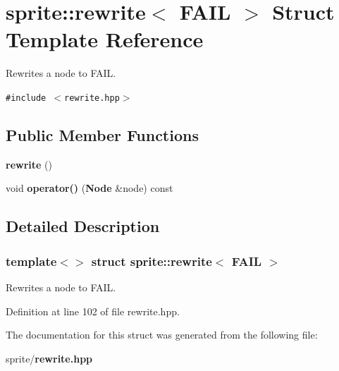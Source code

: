 \section{sprite::rewrite$<$ FAIL $>$ Struct Template Reference}
\label{structsprite_1_1rewrite_3_01FAIL_01_4}
Rewrites a node to FAIL.  


{\tt \#include $<$rewrite.hpp$>$}

\subsection*{Public Member Functions}
\begin{CompactItemize}
\item 
{\bf rewrite} ()\label{structsprite_1_1rewrite_3_01FAIL_01_4_a0}

\item 
void {\bf operator()} ({\bf Node} \&node) const \label{structsprite_1_1rewrite_3_01FAIL_01_4_a1}

\end{CompactItemize}


\subsection{Detailed Description}
\subsubsection*{template$<$$>$ struct sprite::rewrite$<$ FAIL $>$}

Rewrites a node to FAIL. 



Definition at line 102 of file rewrite.hpp.

The documentation for this struct was generated from the following file:\begin{CompactItemize}
\item 
sprite/{\bf rewrite.hpp}\end{CompactItemize}
